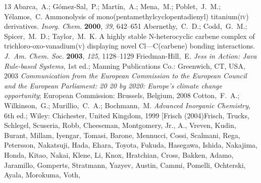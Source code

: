\documentclass[journal=jacsat,manuscript=article]{achemso}
\begin{document}
\begin{mcitethebibliography}{13}
Abarca,~A.; G{\'o}mez-Sal,~P.; Mart{\'i}n,~A.; Mena,~M.; Poblet,~J.~M.;
  Y{\'e}lamos,~C. Ammonolysis of mono(pentamethylcyclopentadienyl)
  titanium(\textsc{iv}) derivatives. \emph{Inorg. Chem.} \textbf{2000},
  \emph{39}, 642--651\relax
\mciteBstWouldAddEndPuncttrue
\mciteSetBstMidEndSepPunct{\mcitedefaultmidpunct}
{\mcitedefaultendpunct}{\mcitedefaultseppunct}\relax
\EndOfBibitem
{}
Abernethy,~C.~D.; Codd,~G.~M.; Spicer,~M.~D.; Taylor,~M.~K. A highly stable
  {N}-heterocyclic carbene complex of trichloro-oxo-vanadium(\textsc{v})
  displaying novel {Cl}---{C}(carbene) bonding interactions. \emph{J.~Am. Chem.
  Soc.} \textbf{2003}, \emph{125}, 1128--1129\relax
\mciteBstWouldAddEndPuncttrue
\mciteSetBstMidEndSepPunct{\mcitedefaultmidpunct}
{\mcitedefaultendpunct}{\mcitedefaultseppunct}\relax
\EndOfBibitem
{}
Friedman-Hill,~E. \emph{{Jess} in Action: {Java} Rule-based Systems}, 1st ed.;
  Manning Publications Co.: Greenwich, CT, USA, 2003\relax
\mciteBstWouldAddEndPuncttrue
\mciteSetBstMidEndSepPunct{\mcitedefaultmidpunct}
{\mcitedefaultendpunct}{\mcitedefaultseppunct}\relax
\EndOfBibitem
{}
\emph{Communication from the European Commission to the European Council and
  the European Parliament: 20 20 by 2020: Europe's climate change opportunity};
  European Commission: Brussels, Belgium, 2008\relax
\mciteBstWouldAddEndPuncttrue
\mciteSetBstMidEndSepPunct{\mcitedefaultmidpunct}
{\mcitedefaultendpunct}{\mcitedefaultseppunct}\relax
\EndOfBibitem
{}
Cotton,~F.~A.; Wilkinson,~G.; Murillio,~C.~A.; Bochmann,~M. \emph{Advanced
  Inorganic Chemistry}, 6th ed.; Wiley: Chichester, United Kingdom, 1999\relax
\mciteBstWouldAddEndPuncttrue
\mciteSetBstMidEndSepPunct{\mcitedefaultmidpunct}
{\mcitedefaultendpunct}{\mcitedefaultseppunct}\relax
\EndOfBibitem
\bibitem[Frisch (2004)Frisch, Trucks, Schlegel, Scuseria, Robb,
  Cheeseman, Montgomery, Jr., A., Vreven, Kudin, Burant, Millam, Iyengar,
  Tomasi, Barone, Mennucci, Cossi, Scalmani, Rega, Petersson, Nakatsuji, Hada,
  Ehara, Toyota, Fukuda, Hasegawa, Ishida, Nakajima, Honda, Kitao, Nakai,
  Klene, Li, Knox, Hratchian, Cross, Bakken, Adamo, Jaramillo, Gomperts,
  Stratmann, Yazyev, Austin, Cammi, Pomelli, Ochterski, Ayala, Morokuma, Voth,

\end{mcitethebibliography}
\end{document}
